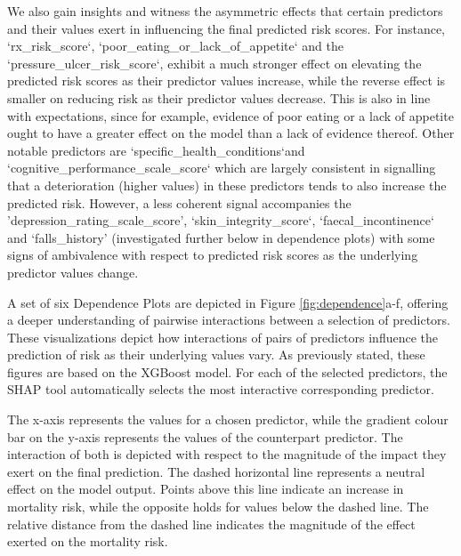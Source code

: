 \documentclass{article}
\begin{document}
We also gain insights and witness the asymmetric effects that certain predictors and their values exert in influencing the final predicted risk scores. For instance, `rx\_risk\_score`, `poor\_eating\_or\_lack\_of\_appetite` and the `pressure\_ulcer\_risk\_score`, exhibit a much stronger effect on elevating the predicted risk scores as their predictor values increase, while the reverse effect is smaller on reducing risk as their predictor values decrease. This is also in line with expectations, since for example, evidence of poor eating or a lack of appetite ought to have a greater effect on the model than a lack of evidence thereof. Other notable predictors are `specific\_health\_conditions`and `cognitive\_performance\_scale\_score` which are largely consistent in signalling that a deterioration (higher values) in these predictors tends to also increase the predicted risk. However, a less coherent signal accompanies the 'depression\_rating\_scale\_score', `skin\_integrity\_score`, `faecal\_incontinence`  and `falls\_history' (investigated further below in dependence plots) with some signs of ambivalence with respect to predicted risk scores as the underlying predictor values change.

A set of six Dependence Plots are depicted in Figure \ref{fig:dependence}a-f, offering a deeper understanding of pairwise interactions between a selection of predictors. These visualizations depict how interactions of pairs of predictors influence the prediction of risk as their underlying values vary. As previously stated, these figures are based on the XGBoost model.
For each of the selected predictors, the SHAP tool automatically selects the most interactive corresponding predictor.

The x-axis represents the values for a chosen predictor, while the gradient colour bar on the y-axis represents the values of the counterpart predictor. The interaction of both is depicted with respect to the magnitude of the impact they exert on the final prediction. The dashed horizontal line represents a neutral effect on the model output. Points above this line indicate an increase in mortality risk, while the opposite holds for values below the dashed line. The relative distance from the dashed line indicates the magnitude of the effect exerted on the mortality risk.
\end{document}
